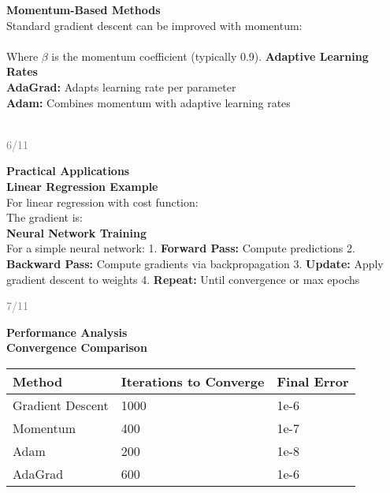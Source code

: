\documentclass[11pt]{article}
\begin{document}
\textbf{\Large Momentum-Based Methods}\\[0.3cm]
Standard gradient descent can be improved with momentum:
\\[\1\\]
\\[\1\\]
Where $\beta$ is the momentum coefficient (typically 0.9).
\textbf{\Large Adaptive Learning Rates}\\[0.3cm]
\textbf{AdaGrad:} Adapts learning rate per parameter
\\[\1\\]
\textbf{Adam:} Combines momentum with adaptive learning rates
\\[\1\\]
\\[\1\\]\n\n\vfill\n\begin{flushright}\n\textcolor{gray}{\small 6/11}\n\end{flushright}\n\n\newpage\n\n\textbf{\huge Practical Applications}\\[0.5cm]
\textbf{\Large Linear Regression Example}\\[0.3cm]
For linear regression with cost function:
\\[\1\\]
The gradient is:
\\[\1\\]
\textbf{\Large Neural Network Training}\\[0.3cm]
For a simple neural network:
1. \textbf{Forward Pass:} Compute predictions
2. \textbf{Backward Pass:} Compute gradients via backpropagation
3. \textbf{Update:} Apply gradient descent to weights
4. \textbf{Repeat:} Until convergence or max epochs\n\n\vfill\n\begin{flushright}\n\textcolor{gray}{\small 7/11}\n\end{flushright}\n\n\newpage\n\n\textbf{\huge Performance Analysis}\\[0.5cm]
\textbf{\Large Convergence Comparison}\\[0.3cm]
\begin{center}
\begin{tabular}{lll}
\hline
\textbf{Method} & \textbf{Iterations to Converge} & \textbf{Final Error} \\
\hline
Gradient Descent & 1000 & 1e-6 \\
Momentum & 400 & 1e-7 \\
Adam & 200 & 1e-8 \\
AdaGrad & 600 & 1e-6 \\
\hline
\end{tabular}
\end{center}\\
\end{document}
